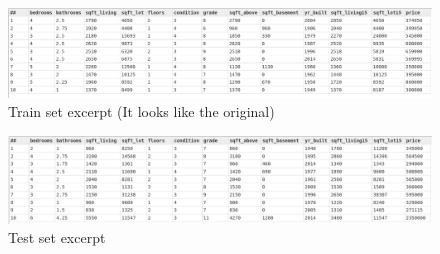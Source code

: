\documentclass[a4paper,oneside,12pt]{book}
\begin{document}
\begin{figure}[h]
    \centering
    \includegraphics[width=\linewidth]{../output/55/train}
    \caption{Train set excerpt (It looks like the original)}
\end{figure}

\begin{figure}[h]
    \centering
    \includegraphics[width=\linewidth]{../output/55/test}
    \caption{Test set excerpt}
\end{figure}
\end{document}
